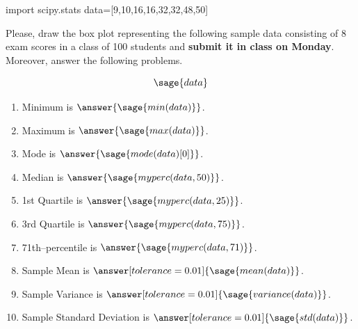 \documentclass{ximera}
\begin{document}
\begin{problem}
\begin{sagesilent}
import scipy.stats
data=[9,10,16,16,32,32,48,50]
\end{sagesilent}
Please, draw the box plot representing the following sample data consisting of 8 exam scores in a class of 100 students and \textbf{submit it in class on Monday}. Moreover, answer the following problems.

$$\sage{data}$$

\begin{enumerate}
    \item Minimum is $\answer{\sage{min(data)}}$.
    \item Maximum is $\answer{\sage{max(data)}}$.
    \item Mode is $\answer{\sage{mode(data)[0]}}$.
    \item Median is $\answer{\sage{myperc(data,50)}}$.
    \item 1st Quartile is $\answer{\sage{myperc(data,25)}}$.
    \item 3rd Quartile is $\answer{\sage{myperc(data,75)}}$.
    \item 71th--percentile is $\answer{\sage{myperc(data,71)}}$.
    \item Sample Mean is $\answer[tolerance=0.01]{\sage{mean(data)}}$.
    \item Sample Variance is $\answer[tolerance=0.01]{\sage{variance(data)}}$.
    \item Sample Standard Deviation is $\answer[tolerance=0.01]{\sage{std(data)}}$.
\end{enumerate}
\end{problem}
\end{document}

